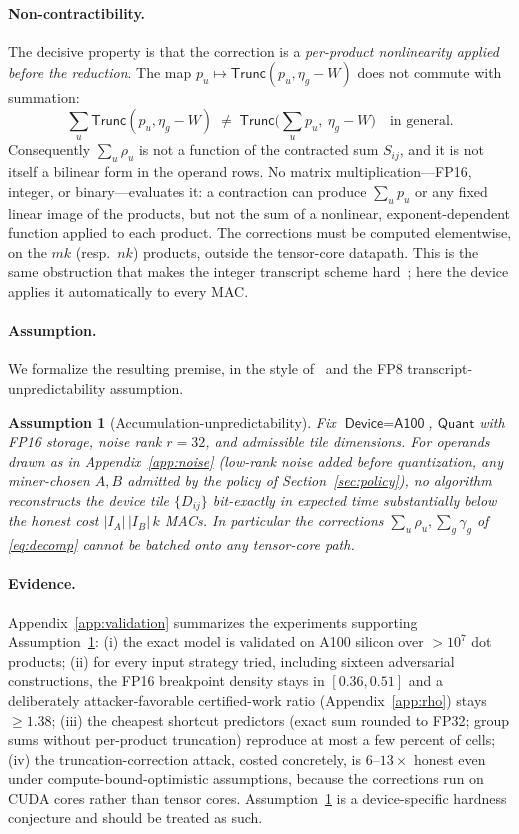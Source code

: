 \documentclass[11pt]{article}
\newcommand{\Quant}{\textsf{Quant}}
\newcommand{\Device}{\textsf{Device}}
\newcommand{\Trunc}{\textsf{Trunc}}
\newcommand{\FP}[1]{\textsf{FP#1}}
\newtheorem{assumption}{Assumption}
\begin{document}
\paragraph{Non-contractibility.} The decisive property is that the correction is a
\emph{per-product nonlinearity applied before the reduction}. The map $p_u\mapsto\Trunc(p_u,\eta_g-W)$
does not commute with summation:
\[
\sum_u \Trunc(p_u,\eta_g-W) \;\neq\; \Trunc\Big(\sum_u p_u,\ \eta_g-W\Big)\quad\text{in general.}
\]
Consequently $\sum_u\rho_u$ is not a function of the contracted sum $S_{ij}$, and it is not
itself a bilinear form in the operand rows. No matrix multiplication---\FP{16}, integer, or
binary---evaluates it: a contraction can produce $\sum_u p_u$ or any fixed linear image of the
products, but not the sum of a nonlinear, exponent-dependent function applied to each product.
The corrections must be computed elementwise, on the $mk$ (resp.\ $nk$) products, outside the
tensor-core datapath. This is the same obstruction that makes the integer transcript scheme
hard~\cite{KW25}; here the device applies it automatically to every MAC.

\paragraph{Assumption.} We formalize the resulting premise, in the style
of~\cite[Assumption~6.4]{KW25} and the \FP{8} transcript-unpredictability assumption.

\begin{assumption}[Accumulation-unpredictability]\label{asm:acc}
Fix $\Device=\textsf{A100}$, $\Quant$ with \FP{16} storage, noise rank $r=32$, and admissible
tile dimensions. For operands drawn as in Appendix~\ref{app:noise} (low-rank noise added before
quantization, any miner-chosen $A,B$ admitted by the policy of Section~\ref{sec:policy}), no
algorithm reconstructs the device tile $\{D_{ij}\}$ bit-exactly in expected time substantially
below the honest cost $|I_A|\,|I_B|\,k$ MACs. In particular the corrections
$\sum_u\rho_u,\sum_g\gamma_g$ of \eqref{eq:decomp} cannot be batched onto any tensor-core path.
\end{assumption}

\paragraph{Evidence.} Appendix~\ref{app:validation} summarizes the experiments supporting
Assumption~\ref{asm:acc}: (i) the exact model is validated on A100 silicon over $>10^7$ dot
products; (ii) for every input strategy tried, including sixteen adversarial constructions, the
\FP{16} breakpoint density stays in $[0.36,0.51]$ and a deliberately attacker-favorable
certified-work ratio (Appendix~\ref{app:rho}) stays $\ge 1.38$; (iii) the cheapest shortcut
predictors (exact sum rounded to \FP{32}; group sums without per-product truncation) reproduce
at most a few percent of cells; (iv) the truncation-correction attack, costed concretely, is
$6\text{--}13\times$ honest even under compute-bound-optimistic assumptions, because the
corrections run on CUDA cores rather than tensor cores. Assumption~\ref{asm:acc} is a
device-specific hardness conjecture and should be treated as such.
\end{document}
